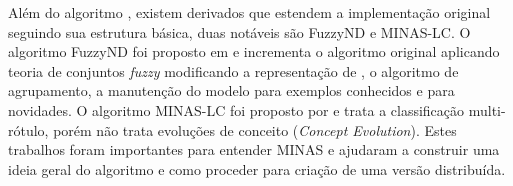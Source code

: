 

Além do algoritmo \minas, existem derivados que estendem a implementação
original seguindo sua estrutura básica, duas notáveis são FuzzyND e MINAS-LC.
O algoritmo FuzzyND foi proposto em  e
incrementa o algoritmo original aplicando teoria de conjuntos \emph{fuzzy}
modificando a representação de \cluster, o algoritmo de agrupamento, a manutenção
do modelo para exemplos conhecidos e para novidades.
O algoritmo MINAS-LC foi proposto por  e trata a
classificação multi-rótulo, porém não trata evoluções de conceito (\emph{Concept
Evolution}).
Estes trabalhos foram importantes para entender MINAS e ajudaram a construir uma
ideia geral do algoritmo e como proceder para criação de uma versão distribuída.




